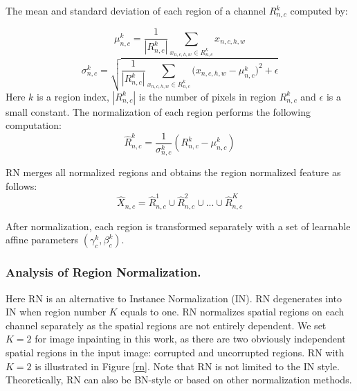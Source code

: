 \documentclass[letterpaper]{article} %
\begin{document}
The mean and standard deviation of each region of a channel $R_{n,c}^{k}$ computed by:

\begin{equation}
\mu_{n,c}^{k}=\frac{1}{|R_{n,c}^{k}|}\sum_{x_{n,c,h,w} \in {R_{n,c}^{k}}}x_{n,c,h,w}
\end{equation} 
\begin{equation}
\sigma_{n,c}^{k}=\sqrt{\frac{1}{|R_{n,c}^{k}|}\sum_{x_{n,c,h,w} \in {R_{n,c}^{k}}}{(x_{n,c,h,w}-\mu_{n,c}^{k}})^2+\epsilon}
\end{equation} 
Here $k$ is a region index, ${|R_{n,c}^{k}|}$ is the number of pixels in region ${R_{n,c}^{k}}$ and $\epsilon$ is a small constant. The normalization of each region performs the following computation:
\begin{equation}
\hat R_{n,c}^{k} =\frac{1}{\sigma_{n,c}^{k}}(R_{n,c}^{k}-\mu_{n,c}^{k}) 
\end{equation} 

RN merges all normalized regions and obtains the region normalized feature as follows:
\begin{equation}
\hat X_{n,c}={\hat R_{n,c}^{1} \cup \hat R_{n,c}^{2} \cup ... \cup \hat R_{n,c}^{K}}
\end{equation} 

After normalization, each region is transformed separately with a set of learnable affine parameters $(\gamma_c^k, \beta_c^k)$.

\subsubsection{Analysis of Region Normalization.}
Here RN is an alternative to Instance Normalization (IN). RN degenerates into IN when region number $K$ equals to one. RN normalizes spatial regions on each channel separately as the spatial regions are not entirely dependent. We set $K=2$ for image inpainting in this work, as there are two obviously independent spatial regions in the input image: corrupted and uncorrupted regions. RN with $K=2$ is illustrated in Figure \ref{rn}. Note that RN is not limited to the IN style. Theoretically, RN can also be BN-style or based on other normalization methods.
\end{document}
